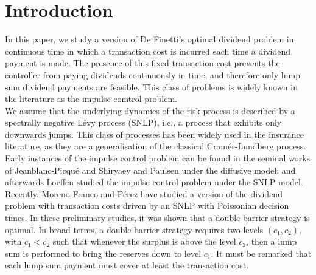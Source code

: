 \documentclass[10pt,a4paper]{amsart}
\begin{document}
\section{Introduction}
In this paper, we study a version of De Finetti's optimal dividend problem in continuous time in which a transaction cost is incurred each time a dividend payment is made. The presence of this fixed transaction cost prevents the controller from paying dividends continuously in time, and therefore only lump sum dividend payments are feasible. This class of problems is widely known in the literature as the impulse comtrol problem.\\
We assume that the underlying dynamics of the risk process is described by a spectrally negative L\'evy process (SNLP), i.e., a process that exhibits only downwards jumps. This class of processes has been widely used in the insurance literature, as they are a generalisation of the classical Cram\'er-Lundberg process. Early instances of the impulse control problem can be found in the seminal works of Jeanblanc-Picqu\'e and Shiryaev \cite{JS1995} and Paulsen \cite{Paulsen2007} under the diffusive model; and afterwards  Loeffen \cite{loeffen2009} studied the impulse control problem under the SNLP model. Recently, Moreno-Franco and P\'erez \cite{MP2024} have studied a version of the dividend problem with transaction costs driven by an SNLP with Poissonian decision times. In these preliminary studies, it was shown that a double barrier strategy is optimal. In broad terms, a double barrier strategy requires two levels $(c_1,c_2)$, with $c_1 < c_2$ such that whenever the surplus is above the level $c_2$, then a lump sum is performed to bring the reserves down to level $c_1$. It must be remarked that each lump sum payment must cover at least the transaction cost.\\
\end{document}
